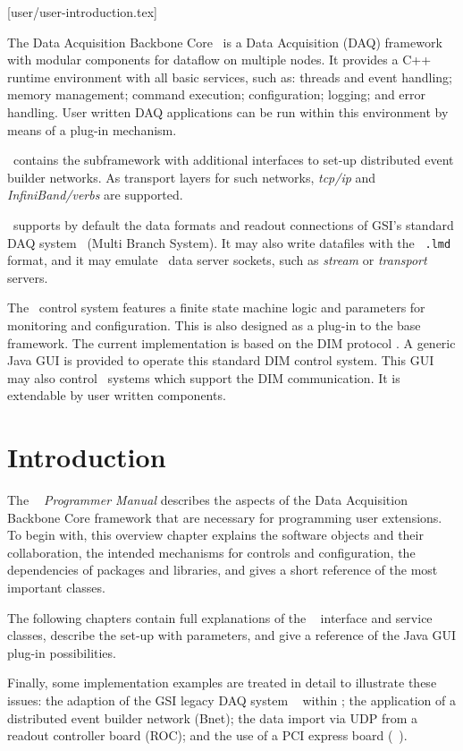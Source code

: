 [user/user-introduction.tex]

The Data Acquisition Backbone Core \dabc\ is a
Data Acquisition (DAQ) framework with modular components for dataflow on multiple nodes.
It provides a C++ runtime environment with all basic services, such as:
threads and event handling; memory management; command execution; 
configuration; logging; and error handling.
User written DAQ applications can be run within this environment by
means of a plug-in mechanism.

\dabc\ contains the  subframework with additional interfaces 
to set-up distributed event builder networks. As transport layers for such
networks, {\em tcp/ip} and {\em InfiniBand/verbs} are supported.

\dabc\ supports by default the data formats and readout connections of GSI's standard DAQ system \mbs\ (Multi Branch System). It may also write datafiles with the 
\mbs\ {\tt *.lmd} format, and it may emulate \mbs\ data server sockets, such as
{\em stream} or {\em transport} servers.

The \dabc\ control system features a finite state machine
logic and parameters for monitoring and  configuration. This is also
designed as a plug-in to the base framework. The current implementation is based
on the DIM protocol \cite{DIM}.
A generic Java GUI is provided to operate this standard DIM control system.
This GUI may also control \mbs\ systems which support the DIM communication.
It is extendable by user written components. 

\section{Introduction}
The {\em \dabc~ Programmer Manual} 
describes the aspects of the Data Acquisition Backbone Core
framework that are necessary for programming user extensions.
To begin with, this overview chapter explains the
software objects and their collaboration, 
the intended mechanisms for controls and configuration, the dependencies of
packages and libraries, and gives a short reference of the most important classes.

The following chapters contain full explanations of the \dabc~ interface 
and service classes, 
describe the set-up with parameters, and give a reference of the Java GUI plug-in possibilities.

Finally, some implementation examples are treated in detail to illustrate these issues:
the adaption of the GSI legacy DAQ system \mbs~ within  \dabc; the application of a distributed
event builder network (Bnet); the data import via UDP from a readout controller board (ROC);
and the use of a PCI express board (\ABB~).

